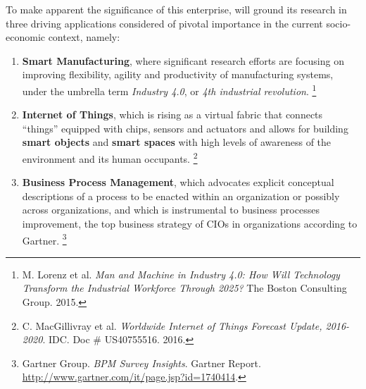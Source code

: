 To make apparent the significance of this enterprise, \project will
ground its research in three driving applications  considered of pivotal
importance in the current socio-economic context, namely:
\begin{enumerate}
\item  \textbf{Smart Manufacturing}, where significant research efforts are focusing on
improving flexibility, agility and productivity of manufacturing
systems, under the umbrella term \emph{Industry 4.0}, or \emph{4th industrial
revolution}.%
\footnote{M. Lorenz et al. \textit{Man and Machine in Industry 4.0: How Will Technology Transform the Industrial Workforce Through 2025? }The Boston Consulting Group. 2015.}

\item \textbf{Internet of Things}, which is rising as a
virtual fabric that connects ``things''
equipped with chips, sensors and actuators and allows for building
\textbf{smart objects}
and \textbf{smart spaces} with high levels of awareness of the environment and its human occupants.%
\footnote{C. MacGillivray et al. \textit{Worldwide Internet of Things Forecast Update, 2016-2020}. IDC. Doc \# US40755516. 2016.}

\item \textbf{Business Process Management}, which advocates explicit
  conceptual descriptions of a process to be enacted within an
  organization or possibly across organizations, and which is
  instrumental to business processes improvement, the top business
  strategy of CIOs in organizations according to
  Gartner. %
\footnote{Gartner Group. \textit{BPM Survey Insights}. Gartner Report. \url{http://www.gartner.com/it/page.jsp?id=1740414}.}
\end{enumerate}


